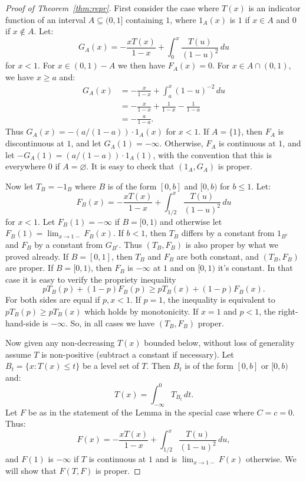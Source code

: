 \documentclass[11pt]{amsart} %
\begin{document}
\begin{proof}[Proof of Theorem~\ref{thm:repr}]
First consider the case where $T(x)$ is an indicator function of an interval $A \subseteq (0,1]$ containing
$1$, where $1_A(x)$ is $1$ if
$x\in A$ and $0$ if $x\notin A$. Let:
$$
	G_A(x) = -\frac{xT(x)}{1-x}+\int_0^x \frac{T(u)}{(1-u)^2} \, du
$$
for $x<1$. For $x \in (0,1)-A$ we then have $F_A(x)=0$. For $x \in A\cap (0,1)$, we have $x\ge a$ and:
$$
\begin{aligned}
	G_A(x) &= -\frac{x}{1-x}+\int_a^x (1-u)^{-2} \,du \\
		 &= -\frac{x}{1-x}+\frac{1}{1-x}-\frac{1}{1-a} \\
		 &= -\frac{a}{1-a}.
\end{aligned}
$$		 
Thus $G_A(x) = -(a/(1-a))\cdot 1_A(x)$ for $x<1$. If $A=\{ 1 \}$, then $F_A$ is discontinuous at $1$,
and let $G_A(1)=-\infty$. Otherwise, $F_A$ is continuous at $1$, and let $-G_A(1)=(a/(1-a))\cdot 1_A(1)$, 
with the convention that this is everywhere $0$ if $A=\varnothing$. It is easy to check that 
$(1_A,G_A)$ is proper.

Now let $T_B = -1_B$ where $B$ is of the form $[0,b]$ and $[0,b)$ for $b\le 1$. Let:
$$
	F_B(x) = -\frac{xT(x)}{1-x}+\int_{1/2}^x \frac{T(u)}{(1-u)^2} \, du
$$
for $x<1$. Let $F_B(1)=-\infty$ if $B=[0,1)$ and otherwise let $F_B(1)=\lim_{x\to 1-} F_B(x)$.
If $b<1$, then $T_B$ differs by a constant from $1_{B^c}$ and $F_B$ by a constant from $G_{B^c}$. Thus
$(T_B,F_B)$ is also proper by what we proved already. If $B=[0,1]$, then $T_B$ and $F_B$ are both constant, and
$(T_B,F_B)$ are proper. If $B=[0,1)$, then $F_B$ is $-\infty$ at $1$ and on $[0,1)$ it's constant. In that
case it is easy to verify the propriety inequality
$$
	p T_B(p) + (1-p) F_B(p) \ge p T_B(x) + (1-p) F_B(x).
$$
For both sides are equal if $p,x<1$. If $p=1$, the inequality is equivalent to $p T_B(p) \ge p T_B(x)$ which
holds by monotonicity. If $x=1$ and $p<1$, the right-hand-side is $-\infty$. So, in all cases we have
$(T_B,F_B)$ proper.

Now given any non-decreasing $T(x)$ bounded below, without loss of generality assume $T$ is non-positive
(subtract a constant if necessary). Let $B_t=\{ x : T(x) \le t \}$ be a level set of $T$. Then $B_t$ is of the form 
$[0,b]$ or $[0,b)$ and:
\begin{equation}\label{eq:Tint}
	T(x) = \int_{-\infty}^0 T_{B_t} \, dt.
\end{equation}
Let $F$ be as in the statement of the Lemma in the special case where $C=c=0$. Thus:
$$
	F(x) = -\frac{xT(x)}{1-x}+\int_{1/2}^x \frac{T(u)}{(1-u)^2} \, du,
$$
and $F(1)$ is $-\infty$ if $T$ is continuous at $1$ and is $\lim_{x\to1-} F(x)$ otherwise.
We will show that $F(T,F)$ is proper.


\end{proof}
\end{document}
